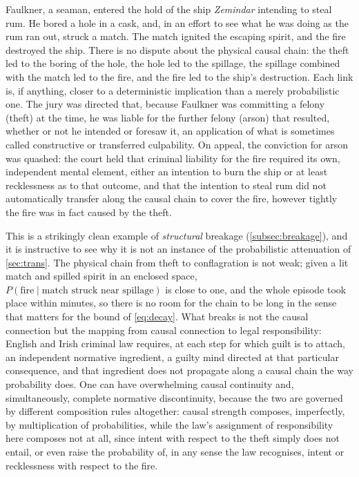 \documentclass[11pt]{article}
\theoremstyle{definition}
\begin{document}
Faulkner, a seaman, entered the hold of the ship \emph{Zemindar} intending to steal rum. He bored a hole in a cask, and, in an effort to see what he was doing as the rum ran out, struck a match. The match ignited the escaping spirit, and the fire destroyed the ship. There is no dispute about the physical causal chain: the theft led to the boring of the hole, the hole led to the spillage, the spillage combined with the match led to the fire, and the fire led to the ship's destruction. Each link is, if anything, closer to a deterministic implication than a merely probabilistic one. The jury was directed that, because Faulkner was committing a felony (theft) at the time, he was liable for the further felony (arson) that resulted, whether or not he intended or foresaw it, an application of what is sometimes called constructive or transferred culpability. On appeal, the conviction for arson was quashed: the court held that criminal liability for the fire required its own, independent mental element, either an intention to burn the ship or at least recklessness as to that outcome, and that the intention to steal rum did not automatically transfer along the causal chain to cover the fire, however tightly the fire was in fact caused by the theft.

This is a strikingly clean example of \emph{structural} breakage (\cref{subsec:breakage}), and it is instructive to see why it is not an instance of the probabilistic attenuation of \cref{sec:trans}. The physical chain from theft to conflagration is not weak; given a lit match and spilled spirit in an enclosed space, $P(\text{fire}\mid\text{match struck near spillage})$ is close to one, and the whole episode took place within minutes, so there is no room for the chain to be long in the sense that matters for the bound of \cref{eq:decay}. What breaks is not the causal connection but the mapping from causal connection to legal responsibility: English and Irish criminal law requires, at each step for which guilt is to attach, an independent normative ingredient, a guilty mind directed at that particular consequence, and that ingredient does not propagate along a causal chain the way probability does. One can have overwhelming causal continuity and, simultaneously, complete normative discontinuity, because the two are governed by different composition rules altogether: causal strength composes, imperfectly, by multiplication of probabilities, while the law's assignment of responsibility here composes not at all, since intent with respect to the theft simply does not entail, or even raise the probability of, in any sense the law recognises, intent or recklessness with respect to the fire.
\end{document}
